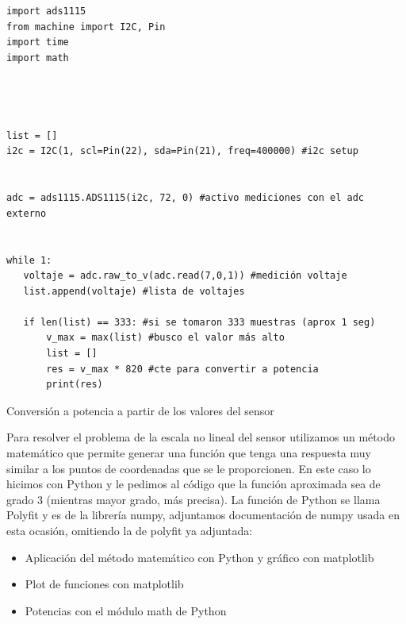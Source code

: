 \begin{listing}[H]
\begin{verbatim}
import ads1115
from machine import I2C, Pin
import time
import math




list = []
i2c = I2C(1, scl=Pin(22), sda=Pin(21), freq=400000) #i2c setup


adc = ads1115.ADS1115(i2c, 72, 0) #activo mediciones con el adc externo


while 1:
   voltaje = adc.raw_to_v(adc.read(7,0,1)) #medición voltaje
   list.append(voltaje) #lista de voltajes
  
   if len(list) == 333: #si se tomaron 333 muestras (aprox 1 seg)
       v_max = max(list) #busco el valor más alto
       list = []
       res = v_max * 820 #cte para convertir a potencia
       print(res)
\end{verbatim}
\caption{Conversión a potencia a partir de los valores del sensor}
\label{conversion directa a potencia}
\end{listing}

Para resolver el problema de la escala no lineal del sensor utilizamos un método matemático que permite generar una función que tenga una respuesta muy similar a los puntos de coordenadas que se le proporcionen. En este caso lo hicimos con Python y le pedimos al código que la función aproximada sea de grado 3 (mientras mayor grado, más precisa). La función de Python se llama Polyfit y es de la librería numpy, adjuntamos documentación de numpy usada en esta ocasión, omitiendo la de polyfit ya adjuntada:\\
\begin{itemize}
\item Aplicación del método matemático con Python y gráfico con matplotlib
\item Plot de funciones con matplotlib
\item Potencias con el módulo math de Python
\end{itemize}


